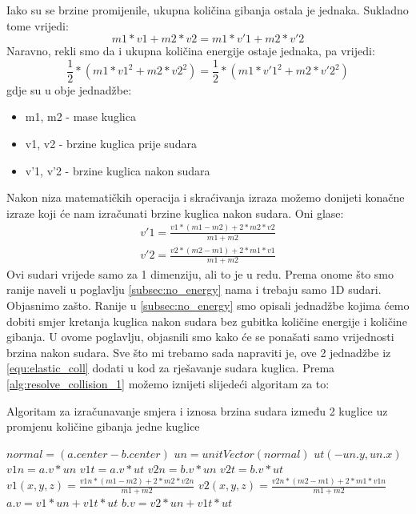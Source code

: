 Iako su se brzine promijenile, ukupna količina gibanja ostala je jednaka. Sukladno tome vrijedi:
\begin{equation}\label{equ:kol_gib}
	m1 * v1 + m2 * v2 = m1 * v'1 + m2 * v'2
\end{equation}
Naravno, rekli smo da i ukupna količina energije ostaje jednaka, pa vrijedi:
\begin{equation}\label{equ:kol_energ}
\frac{1}{2} * (m1 * v1^2 + m2 * v2^2) = \frac{1}{2} * (m1 * v'1^2 + m2 * v'2^2)
\end{equation}
gdje su u obje jednadžbe:
\begin{itemize}
	\item m1, m2 - mase kuglica
	\item v1, v2 - brzine kuglica prije sudara
	\item v'1, v'2 - brzine kuglica nakon sudara
\end{itemize}
Nakon niza matematičkih operacija i skraćivanja izraza možemo donijeti konačne izraze koji će nam izračunati brzine kuglica nakon sudara. Oni glase\cite{13}:
\begin{equation}\label{equ:elastic_coll}
	\begin{aligned}
		v'1 = \frac{v1 * (m1 - m2) + 2 * m2 *v2}{m1 + m2}\\
		v'2 = \frac{v2 * (m2 - m1) + 2 * m1 *v1}{m1 + m2}
	\end{aligned}
\end{equation}
Ovi sudari vrijede samo za 1 dimenziju, ali to je u redu\cite{13}. Prema onome što smo ranije naveli u poglavlju \ref{subsec:no_energy} nama i trebaju samo 1D sudari. Objasnimo zašto. Ranije u \ref{subsec:no_energy} smo opisali jednadžbe kojima ćemo dobiti smjer kretanja kuglica nakon sudara bez gubitka količine energije i količine gibanja. U ovome poglavlju, objasnili smo kako će se ponašati samo vrijednosti brzina nakon sudara. Sve što mi trebamo sada napraviti je, ove 2 jednadžbe iz \ref{equ:elastic_coll} dodati u kod za rješavanje sudara kuglica. Prema \ref{alg:resolve_collision_1} možemo iznijeti slijedeći algoritam za to:\newpage
\begin{algorithm}
	\caption{Algoritam za izračunavanje smjera i iznosa brzina sudara između 2 kuglice uz promjenu količine gibanja jedne kuglice}
	\label{alg:resolve_collision_2}
	\begin{algorithmic}
		\Return
		\EndIf
		\State $normal = (a.center - b.center)$
		\State $un = unitVector(normal)$
		\State $ut(-un.y,un.x)$
		\State $v1n = a.v * un$
		\State $v1t = a.v * ut$
		\State $v2n = b.v * un$
		\State $v2t = b.v * ut$
		\State $v1(x,y,z) = \frac{v1n * (m1 - m2) + 2 * m2 *v2n}{m1 + m2}$
		\State $v2(x,y,z) = \frac{v2n * (m2 - m1) + 2 * m1 *v1n}{m1 + m2}$
		\State $a.v = v1 * un + v1t * ut$
		\State $b.v = v2 * un + v1t * ut$
		\EndFunction
	\end{algorithmic}
\end{algorithm}\

